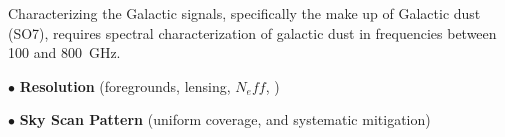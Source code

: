 \documentclass[PICOReport.tex]{subfiles}
\begin{document}
Characterizing the Galactic signals, specifically the make up of Galactic dust (SO7), requires spectral characterization 
of galactic dust in frequencies between 100 and 800~GHz.  

$\bullet$ {\bf Resolution} \hspace{0.1in} (foregrounds, lensing, $N_eff$, )

$\bullet$ {\bf Sky Scan Pattern} \hspace{0.1in} (uniform coverage, and systematic mitigation)


 
 
\end{document}
